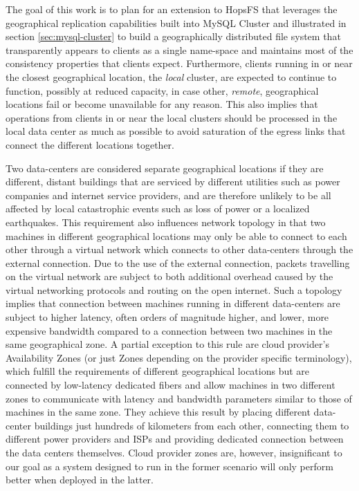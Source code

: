 The goal of this work is to plan for an extension to HopsFS that leverages the geographical replication capabilities built into MySQL Cluster and illustrated in section \ref{sec:mysql-cluster} to build a geographically distributed file system that transparently appears to clients as a single name-space and maintains most of the consistency properties that clients expect.
Furthermore, clients running in or near the closest geographical location, the \emph{local} cluster, are expected to continue to function, possibly at reduced capacity, in case other, \emph{remote}, geographical locations fail or become unavailable for any reason.
This also implies that operations from clients in or near the local clusters should be processed in the local data center as much as possible to avoid saturation of the egress links that connect the different locations together.

Two data-centers are considered separate geographical locations if they are different, distant buildings that are serviced by different utilities such as power companies and internet service providers, and are therefore unlikely to be all affected by local catastrophic events such as loss of power or a localized earthquakes.
This requirement also influences network topology in that two machines in different geographical locations may only be able to connect to each other through a virtual network which connects to other data-centers through the external connection.
Due to the use of the external connection, packets travelling on the virtual network are subject to both additional overhead caused by the virtual networking protocols and routing on the open internet.
Such a topology implies that connection between machines running in different data-centers are subject to higher latency, often orders of magnitude higher, and lower, more expensive bandwidth compared to a connection between two machines in the same geographical zone.
A partial exception to this rule are cloud provider's Availability Zones (or just Zones depending on the provider specific terminology), which fulfill the requirements of different geographical locations but are connected by low-latency dedicated fibers and allow machines in two different zones to communicate with latency and bandwidth parameters similar to those of machines in the same zone.
They achieve this result by placing different data-center buildings just hundreds of kilometers from each other, connecting them to different power providers and ISPs and providing dedicated connection between the data centers themselves.
Cloud provider zones are, however, insignificant to our goal as a system designed to run in the former scenario will only perform better when deployed in the latter.

